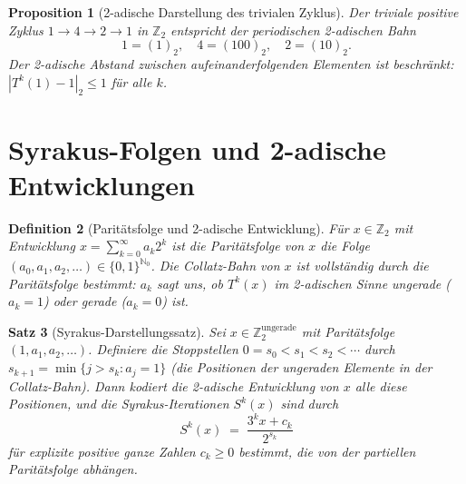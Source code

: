 \documentclass[12pt,a4paper]{article}
\newtheorem{theorem}{Satz}[section]
\newtheorem{proposition}[theorem]{Proposition}
\newtheorem{definition}[theorem]{Definition}
\begin{document}
\begin{proposition}[2-adische Darstellung des trivialen Zyklus]\label{prop:trivial_2adisch}
Der triviale positive Zyklus $1 \to 4 \to 2 \to 1$ in $\mathbb{Z}_2$ entspricht der
periodischen 2-adischen Bahn
\[
  1 = (1)_2, \quad 4 = (100)_2, \quad 2 = (10)_2.
\]
Der 2-adische Abstand zwischen aufeinanderfolgenden Elementen ist beschränkt:
$|T^k(1) - 1|_2 \leq 1$ für alle $k$.
\end{proposition}

\section{Syrakus-Folgen und 2-adische Entwicklungen}\label{sec:syrakus}

\begin{definition}[Paritätsfolge und 2-adische Entwicklung]\label{def:parität}
Für $x \in \mathbb{Z}_2$ mit Entwicklung $x = \sum_{k=0}^\infty a_k 2^k$ ist die
\emph{Paritätsfolge} von $x$ die Folge $(a_0, a_1, a_2, \ldots) \in \{0,1\}^{\mathbb{N}_0}$.
Die Collatz-Bahn von $x$ ist vollständig durch die Paritätsfolge bestimmt:
$a_k$ sagt uns, ob $T^k(x)$ im 2-adischen Sinne ungerade ($a_k = 1$) oder gerade ($a_k = 0$) ist.
\end{definition}

\begin{theorem}[Syrakus-Darstellungssatz]\label{thm:syrakus_darst}
Sei $x \in \mathbb{Z}_2^{\text{ungerade}}$ mit Paritätsfolge $(1, a_1, a_2, \ldots)$.
Definiere die Stoppstellen $0 = s_0 < s_1 < s_2 < \cdots$ durch
$s_{k+1} = \min\{j > s_k : a_j = 1\}$
(die Positionen der ungeraden Elemente in der Collatz-Bahn).
Dann kodiert die 2-adische Entwicklung von $x$ alle diese Positionen, und die
Syrakus-Iterationen $S^k(x)$ sind durch
\[
  S^k(x) \;=\; \frac{3^k x + c_k}{2^{s_k}}
\]
für explizite positive ganze Zahlen $c_k \geq 0$ bestimmt, die von der partiellen
Paritätsfolge abhängen.
\end{theorem}
\end{document}
